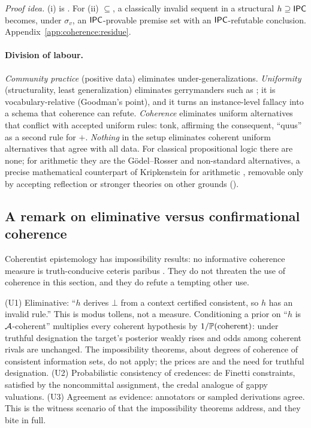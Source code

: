 \noindent\emph{Proof idea.} (i) is . For (ii) $\subseteq$, a classically invalid sequent in a structural $h\supseteq\mathsf{IPC}$ becomes, under $\sigma_v$, an $\mathsf{IPC}$-provable premise set with an $\mathsf{IPC}$-refutable conclusion. Appendix~\ref{app:coherence:residue}.

\paragraph{Division of labour.} \emph{Community practice} (positive data) eliminates under-generalizations. \emph{Uniformity} (structurality, least generalization) eliminates gerrymanders such as ; it is vocabulary-relative (Goodman's point), and it turns an instance-level fallacy into a schema that coherence can refute. \emph{Coherence} eliminates uniform alternatives that conflict with accepted uniform rules: tonk, affirming the consequent, ``quus'' as a second rule for $+$. \emph{Nothing} in the setup eliminates coherent uniform alternatives that agree with all data. For classical propositional logic there are none; for arithmetic they are the G\"odel--Rosser and non-standard alternatives, a precise mathematical counterpart of Kripkenstein for arithmetic \citep{kripke1982wittgenstein}, removable only by accepting reflection or stronger theories on other grounds ().

\subsection{A remark on eliminative versus confirmational coherence}\label{sec:coherence:eliminative}

Coherentist epistemology has impossibility results: no informative coherence measure is truth-conducive ceteris paribus \citep{bovens2003solving,bovens2003bayesian,olsson2005against,olsson2005impossibility}. They do not threaten the use of coherence in this section, and they do refute a tempting other use.

\begin{remark}\label{rem:coherence:uses}
\textup{(U1) Eliminative}: ``$h$ derives $\bot$ from a context certified consistent, so $h$ has an invalid rule.'' This is modus tollens, not a measure. Conditioning a prior on ``$h$ is $\mathcal{A}$-coherent'' multiplies every coherent hypothesis by $1/\mathbb{P}(\text{coherent})$: under truthful designation the target's posterior weakly rises and odds among coherent rivals are unchanged. The impossibility theorems, about degrees of coherence of consistent information sets, do not apply; the prices are  and the need for truthful designation. \textup{(U2) Probabilistic consistency} of credences: de Finetti constraints, satisfied by the noncommittal assignment, the credal analogue of gappy valuations. \textup{(U3) Agreement as evidence}: annotators or sampled derivations agree. This is the witness scenario of \citet{lewis1946analysis} that the impossibility theorems address, and they bite in full.
\end{remark}


